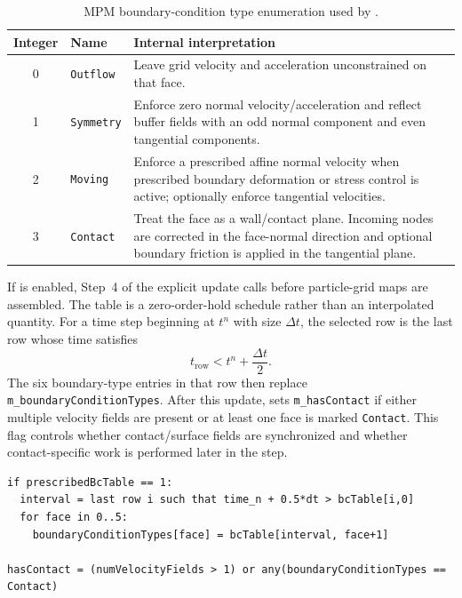 \begin{table}[htbp]
\centering
\caption{MPM boundary-condition type enumeration used by .}
\label{tab:bc-types}
\begin{tabularx}{\linewidth}{@{}c l X@{}}
\toprule
Integer & Name & Internal interpretation \\
\midrule
0 & \texttt{Outflow} & Leave grid velocity and acceleration unconstrained on that face. \\
1 & \texttt{Symmetry} & Enforce zero normal velocity/acceleration and reflect buffer fields with an odd normal component and even tangential components. \\
2 & \texttt{Moving} & Enforce a prescribed affine normal velocity when prescribed boundary deformation or stress control is active; optionally enforce tangential velocities. \\
3 & \texttt{Contact} & Treat the face as a wall/contact plane.  Incoming nodes are corrected in the face-normal direction and optional boundary friction is applied in the tangential plane. \\
\bottomrule
\end{tabularx}
\end{table}

If  is enabled, Step~4 of the explicit update calls  before particle-grid maps are assembled.  The table is a zero-order-hold schedule rather than an interpolated quantity.  For a time step beginning at $t^n$ with size $\Delta t$, the selected row is the last row whose time satisfies
\begin{equation}
  t_{\mathrm{row}} < t^n+\frac{\Delta t}{2}.
  \label{eq:bc-table-selection}
\end{equation}
The six boundary-type entries in that row then replace \texttt{m\_boundaryConditionTypes}.  After this update,  sets \texttt{m\_hasContact} if either multiple velocity fields are present or at least one face is marked \texttt{Contact}.  This flag controls whether contact/surface fields are synchronized and whether contact-specific work is performed later in the step.

\begin{lstlisting}[caption={Boundary-type update and contact flag refresh.}]
if prescribedBcTable == 1:
  interval = last row i such that time_n + 0.5*dt > bcTable[i,0]
  for face in 0..5:
    boundaryConditionTypes[face] = bcTable[interval, face+1]

hasContact = (numVelocityFields > 1) or any(boundaryConditionTypes == Contact)
\end{lstlisting}

